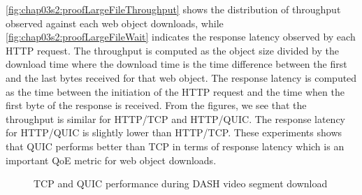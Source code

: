 \fig\ref{fig:chap03s2:proofLargeFileThroughput} shows the distribution of throughput observed against each web object downloads, while \fig\ref{fig:chap03s2:proofLargeFileWait} indicates the response latency observed by each \ac{HTTP} request. The throughput is computed as the object size divided by the download time where the download time is the time difference between the first and the last bytes received for that web object. The response latency is computed as the time between the initiation of the \ac{HTTP} request and the time when the first byte of the response is received. From the figures, we see that the throughput is similar for HTTP/TCP and HTTP/QUIC. The response latency for HTTP/QUIC is slightly lower than HTTP/TCP. These experiments shows that \ac{QUIC} performs better than \ac{TCP} in terms of response latency which is an important \ac{QoE} metric for web object downloads.


\begin{figure}[!ht]
	\captionsetup[subfigure]{}
	\begin{center}
		\hfill
	\end{center}
	\caption{\label{fig:chap03s2:dashcomp}\acs{TCP} and \acs{QUIC} performance during DASH video segment download}
\end{figure}


